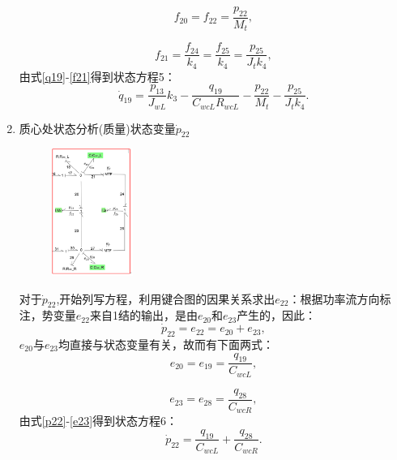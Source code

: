 \begin{enumerate}
\begin{equation}
f _ { 20 } = f _ { 22 } = \frac { p _ { 22 } } { M _ { t } },
\end{equation}

\begin{equation}\label{f21}
f _ { 21 } = \frac { f _ { 24 } } { k _ { 4 } } = \frac { f _ { 25 } } { k _ { 4 } } = \frac { p _ { 25 } } { J _ { t } k _ { 4 } },
\end{equation}
由式\ref{q19}-\ref{f21}得到状态方程5：
\begin{equation}
\dot { q } _ { 19 } = \frac { p _ { 13 } } { J _ { w L }  } k _ { 3 } - \frac { q _ { 19 } } { C _ { w c L }  R _ { w c L }  } - \frac { p _ { 22 } } { M _ { t } } - \frac { p _ { 25 } } { J _ { t } k _ { 4 } }.
\end{equation}

\item {质心处状态分析(质量)状态变量$\dot{ p}_{22} $}
\begin{figure}[H]
	\centering
	\includegraphics[width=0.25\textwidth]{fig/equation6.png}
	\caption{}\label{fig:equation6}
\end{figure}
对于$\dot{p} _ { 22 }$,开始列写方程，利用键合图的因果关系求出$e_{22}$：根据功率流方向标注，势变量$e_{22}$来自1结的输出，是由$e_{20}$和$e_{23}$产生的，因此：
\begin{equation}\label{p22}
\dot{ p }  _ { 22 } = e _ { 22 } = e _ { 20 } + e _ { 23 },
\end{equation}
$e_{20}$与$e_{23}$均直接与状态变量有关，故而有下面两式：
\begin{equation}
e _ { 20 } = e _ { 19 } = \frac { q _ { 19 } } { C _ { w cL }  },
\end{equation}

\begin{equation}\label{e23}
e _ { 23 } = e _ { 28 } = \frac { q _ { 28 } } { C _ { w c R }  },
\end{equation}
由式\ref{p22}-\ref{e23}得到状态方程6：
\begin{equation}
\dot{ p } _ { 22 } = \frac { q _ { 19 } } { C _ { w c L } } + \frac { q _ { 28 } } { C _ { w c R  } }.
\end{equation}


\end{enumerate}
